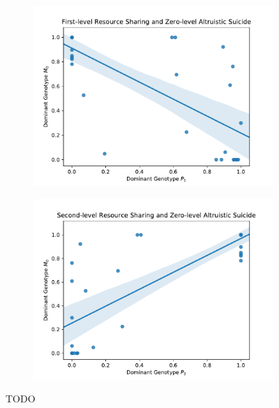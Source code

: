 \begin{figure}[t]
\begin{center}

\begin{subfigure}[b]{\columnwidth}
  \includegraphics[width=\columnwidth]{img/champion_res_pool1_vs_champion_damage_suicide0}
  \label{fig:champion_res_pool1_vs_champion_damage_suicide0}
\end{subfigure}

\begin{subfigure}[b]{\columnwidth}
  \includegraphics[width=\columnwidth]{img/champion_res_pool2_vs_champion_damage_suicide0}
  \label{fig:champion_res_pool2_vs_champion_damage_suicide0}
\end{subfigure}

\caption{
TODO
}
\label{fig:damage_suicide}
\end{center}
\end{figure}
